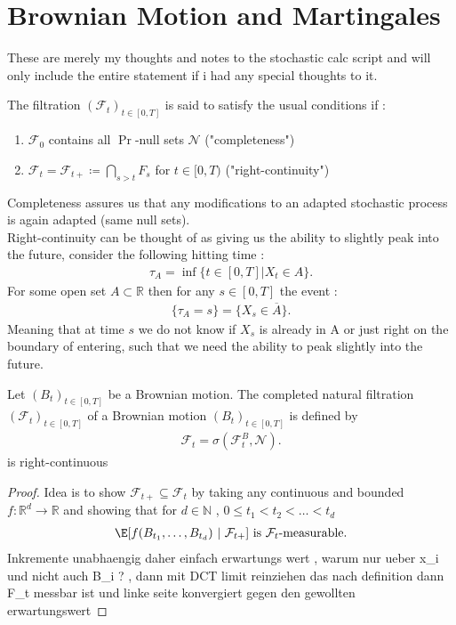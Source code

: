 \chapter{Brownian Motion and Martingales}
These are merely my thoughts and notes to the stochastic calc script and will only 
include the entire statement if i had any special thoughts to it. \\[1ex]

\begin{definition}
  The filtration $(\mathcal{F}_t)_{t \in [0,T]}$ is said to satisfy the usual conditions if : 
  \begin{enumerate}
    \item $\mathcal{F}_0$ contains all $\Pr$-null sets $\mathcal{N}$ ("completeness") 
    \item $\mathcal{F}_t = \mathcal{F}_{t+} \coloneqq \bigcap_{s>t} F_s$ for $t \in [0,T)$ ("right-continuity")
  \end{enumerate}
\end{definition}
\begin{remark}
 Completeness assures us that any modifications to an adapted stochastic process is again adapted (same null sets). \\
 Right-continuity can be thought of as giving us the ability to slightly peak into the future, consider the following hitting time :
 \begin{align*}
   \tau_A = \inf \{t \in [0,T] | X_t \in A\}
 .\end{align*}
 For some open set $A \subset  \mathbb{R}$ then for any $s \in  [0,T]$  the event : 
 \begin{align*}
   \{\tau_A = s\}   = \{X_s \in  \overline{A} \}  
 .\end{align*}
 Meaning that at time $s$ we do not know if $X_s$ is already in A or just right on the boundary of entering, such that we need the ability to peak slightly into
 the future.
\end{remark}
\begin{prop}
  Let $(B_t)_{t \in [0,T]}$  be a Brownian motion. The completed natural filtration $(\mathcal{F}_t)_{t \in  [0,T]}$ of a Brownian motion $(B_t)_{t \in [0,T]}$ is defined by  
  \begin{align*}
    \mathcal{F}_t =  \sigma(\mathcal{F}_t^{B},\mathcal{N} )
  .\end{align*}
  is right-continuous 
\end{prop}
\begin{proof}
  Idea is to show $\mathcal{F}_{t+} \subseteq \mathcal{F}_t$ by taking any continuous and bounded $f : \mathbb{R}^{d} \to  \mathbb{R} $ and showing that for $d \in  \mathbb{N}$ , $0 \le t_1<t_2<\ldots <t_d$
  \begin{align*}
    \E[f(B_{t_1},\ldots ,B_{t_d}) \ | \ \mathcal{F}_{t+}] \text{ is } \mathcal{F}_t \text{-measurable}
  .\end{align*}
  Inkremente unabhaengig daher einfach erwartungs wert , warum nur ueber x_i und nicht auch B_i ? , dann mit DCT limit reinziehen das nach definition dann F_t messbar ist und linke seite konvergiert gegen den gewollten erwartungswert
\end{proof}
